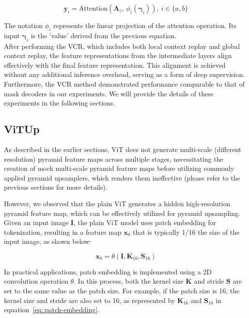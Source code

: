 \begin{equation}
    \mathbf{y}_{i} = \text{Attention}(\mathbf{\Lambda}_{z},~\phi_{i}(\mathbf{\gamma}_{i})),~i\in \{a, b\}
\end{equation}

The notation $\phi_{i}$ represents the linear projection of the attention operation. Its input $\mathbf{\gamma}_{i}$ is the 'value' derived from the previous equation.\\

After performing the VCR, which includes both local context replay and global context replay, the feature representations from the intermediate layers align effectively with the final feature representation. This alignment is achieved without any additional inference overhead, serving as a form of deep supervision. Furthermore, the VCR method demonstrated performance comparable to that of mask decoders in our experiments. 
We will provide the details of these experiments in the following sections.


\subsection{ViTUp}

As described in the earlier sections, ViT does not generate multi-scale (\eg different resolution) pyramid feature maps across multiple stages, necessitating the creation of mock multi-scale pyramid feature maps before utilizing commonly applied pyramid upsamplers, which renders them ineffective (please refer to the previous sections for more details).

However, we observed that the plain ViT generates a hidden high-resolution pyramid feature map, which can be effectively utilized for pyramid upsampling.
%
Given an input image $\mathbf{I}$, the plain ViT model uses patch embedding for tokenization, resulting in a feature map $\mathbf{x}_{0}$ that is typically 1/16 the size of the input image, as shown below:

\begin{equation}
    \mathbf{x}_{0} = \theta(\mathbf{I}, \mathbf{K}_{\text{16}}, \mathbf{S}_{\text{16}})
    \label{eq::patch-embedding}
\end{equation}

In practical applications, patch embedding is implemented using a 2D convolution operation $\theta$. 
%
In this process, both the kernel size $\mathbf{K}$ and stride $\mathbf{S}$ are set to the same value as the patch size. 
%
For example, if the patch size is 16, the kernel size and stride are also set to 16, as represented by $\mathbf{K}_{\text{16}}$ and $\mathbf{S}_{\text{16}}$ in equation~\ref{eq::patch-embedding}.

